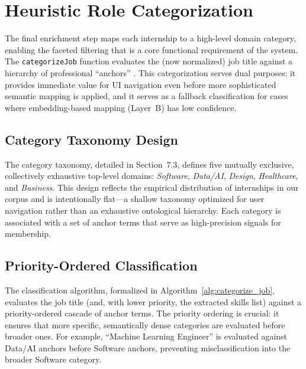 \section{Heuristic Role Categorization}

The final enrichment step maps each internship to a high-level domain category, enabling the faceted filtering that is a core functional requirement of the system. The \texttt{categorizeJob} function evaluates the (now normalized) job title against a hierarchy of professional ``anchors'' \cite{baeza2011modern, croft2010search}. This categorization serves dual purposes: it provides immediate value for UI navigation even before more sophisticated semantic mapping is applied, and it serves as a fallback classification for cases where embedding-based mapping (Layer~B) has low confidence.

\subsection{Category Taxonomy Design}

The category taxonomy, detailed in Section~7.3, defines five mutually exclusive, collectively exhaustive top-level domains: \textit{Software}, \textit{Data/AI}, \textit{Design}, \textit{Healthcare}, and \textit{Business}. This design reflects the empirical distribution of internships in our corpus and is intentionally flat—a shallow taxonomy optimized for user navigation rather than an exhaustive ontological hierarchy. Each category is associated with a set of anchor terms that serve as high-precision signals for membership.

\subsection{Priority-Ordered Classification}

The classification algorithm, formalized in Algorithm~\ref{alg:categorize_job}, evaluates the job title (and, with lower priority, the extracted skills list) against a priority-ordered cascade of anchor terms. The priority ordering is crucial: it ensures that more specific, semantically dense categories are evaluated before broader ones. For example, ``Machine Learning Engineer'' is evaluated against Data/AI anchors before Software anchors, preventing misclassification into the broader Software category.

